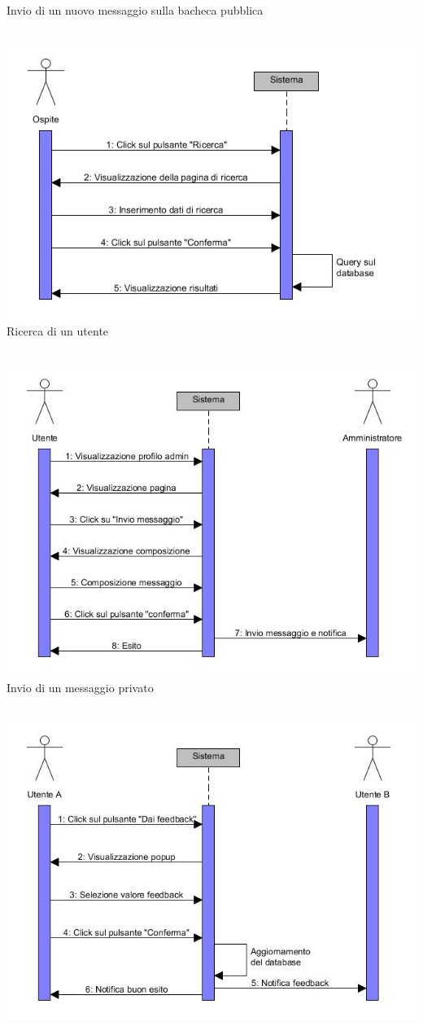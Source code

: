 \documentclass[a4paper,12pt]{article}
\begin{document}
\begin{center}
\caption{Invio di un nuovo messaggio sulla bacheca pubblica} \\
\clearpage
\includegraphics[scale=0.75]{sDiagrams/ricercaUtenti.jpg} \\
\caption{Ricerca di un utente} \\
\vspace*{\fill}
\includegraphics[scale=0.75]{sDiagrams/invioMessaggio.jpg} \\
\caption{Invio di un messaggio privato} \\
\clearpage
\includegraphics[scale=0.75]{sDiagrams/invioFeedback.jpg} \\

\end{center}
\end{document}
